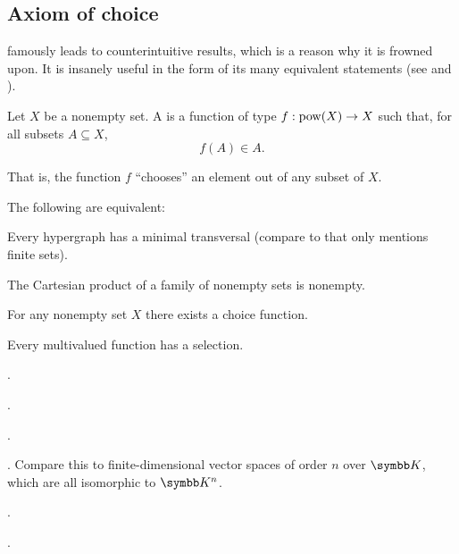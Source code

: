 \subsection{Axiom of choice}\label{subsec:axiom_of_choice}

\begin{remark}\label{remark:aoc}
   famously leads to counterintuitive results, which is a reason why it is frowned upon. It is insanely useful in the form of its many equivalent statements (see  and ).
\end{remark}

\begin{definition}\label{def:choice_function}
  Let \( X \) be a nonempty set. A  is a function of type \( f: \operatorname{pow}(X) \to X \) such that, for all subsets \( A \subseteq X \),
  \begin{equation*}
    f(A) \in A.
  \end{equation*}

  That is, the function \( f \) \enquote{chooses} an element out of any subset of \( X \).
\end{definition}

\begin{theorem}\label{thm:aoc}
  The following are equivalent:

  \begin{thmenum}
    \cite[theorem 6M(4)]{Enderton1977} Every hypergraph has a minimal transversal (compare to  that only mentions finite sets).

    \cite[theorem 6M(2)]{Enderton1977} The Cartesian product of a family of nonempty sets is nonempty.

    \cite[theorem 6M(3)]{Enderton1977} For any nonempty set \( X \) there exists a choice function.

    \cite[theorem 6M(1)]{Enderton1977} Every multivalued function has a selection.

     .

     .

     .

     . Compare this to finite-dimensional vector spaces of order \( n \) over \( \BK \), which are all isomorphic to \( \BK^n \).

     .

     .
  \end{thmenum}
\end{theorem}
